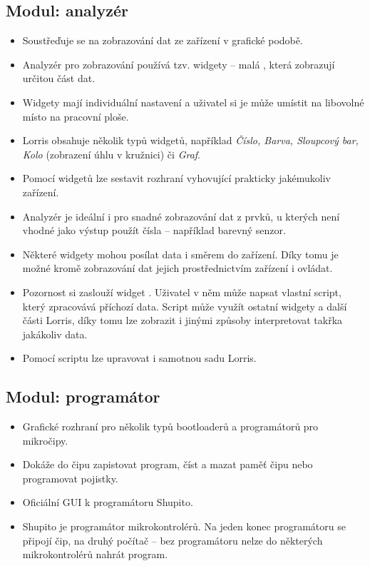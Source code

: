 \documentclass[12pt, a4paper, oneside]{article}
\newcommand{\It}{\textit}  %
\begin{document}
\subsection*{Modul: analyzér}
\begin{itemize} 
    \item Soustřeďuje se na zobrazování dat ze zařízení v grafické podobě.
    \item Analyzér pro zobrazování používá tzv. widgety -- malá , která zobrazují určitou část dat.
    \item Widgety mají individuální nastavení a uživatel si je může umístit na libovolné místo na pracovní ploše.
    \item Lorris obsahuje několik typů widgetů, například \It{Číslo, Barva, Sloupcový bar, Kolo} (zobrazení úhlu v kružnici) či \It{Graf}.
    \item Pomocí widgetů lze sestavit rozhraní vyhovující prakticky jakémukoliv zařízení.
    \item Analyzér je ideální i pro snadné zobrazování dat z prvků, u kterých není vhodné jako výstup použít čísla -- například barevný senzor.
    \item Některé widgety mohou posílat data i směrem do zařízení. Díky tomu je možné kromě zobrazování dat jejich prostřednictvím zařízení i ovládat.
    \item Pozornost si zaslouží widget . Uživatel v něm může napsat vlastní script, který zpracovává příchozí data. Script může využít ostatní widgety a další části Lorris, díky tomu lze zobrazit i jinými způsoby interpretovat takřka jakákoliv data.
    \item Pomocí scriptu lze upravovat i samotnou sadu Lorris.
\end{itemize}

\subsection*{Modul: programátor}
\begin{itemize}
    \item Grafické rozhraní pro několik typů bootloaderů a programátorů pro mikročipy.
    \item Dokáže do čipu zapistovat program, číst a mazat paměť čipu nebo programovat pojistky.
    \item Oficiální GUI k programátoru Shupito.
    \item Shupito je programátor mikrokontrolérů. Na jeden konec programátoru se připojí čip, na druhý počítač -- bez programátoru nelze do některých mikrokontrolérů nahrát program.
\end{itemize}
\end{document}
